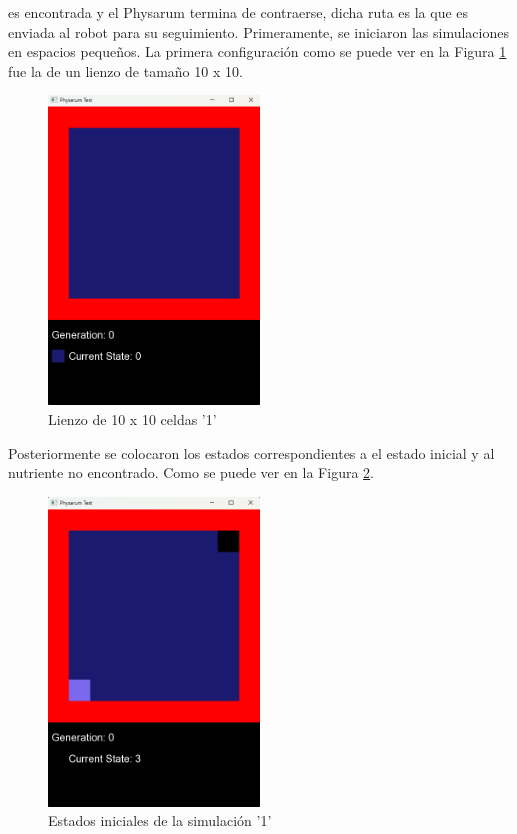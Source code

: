         es encontrada y el Physarum termina de contraerse, dicha
        ruta es la que es enviada al robot para su seguimiento.
        Primeramente, se iniciaron las simulaciones en espacios
        peque\~nos. La primera configuraci\'on como se puede ver en la Figura \ref{fig:10x1001} fue la de un
        lienzo de tama\~no 10 x 10.
    \vskip 0.5cm
    \begin{figure}[htbp]
        \centering
        \includegraphics[width=0.5\textwidth]{./images/Pruebas/simulador/image001.png}
        \caption{Lienzo de 10 x 10 celdas '1'} 
        \label{fig:10x1001}
    \end{figure}
    \vskip 0.5cm
    Posteriormente se colocaron los estados correspondientes a
    el estado inicial y al nutriente no encontrado. Como se puede
    ver en la Figura \ref{fig:Estadosiniciales01}.
    \vskip 0.5cm
    \begin{figure}[htbp]
        \centering
        \includegraphics[width=0.5\textwidth]{./images/Pruebas/simulador/image002.png}
        \caption{Estados iniciales de la simulaci\'on '1'} 
        \label{fig:Estadosiniciales01}
    \end{figure}
